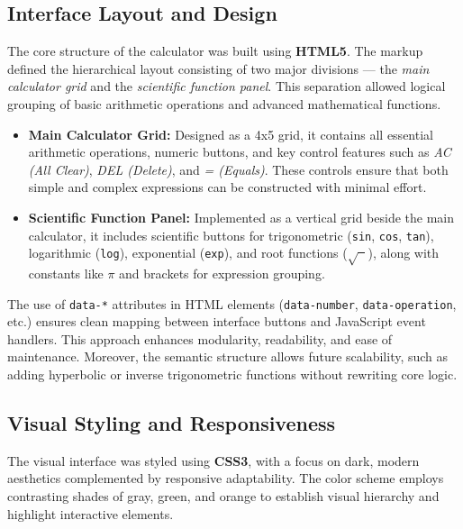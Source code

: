 \documentclass[a4paper,12pt,oneside]{report}
\numberwithin{equation}{chapter}
\numberwithin{figure}{chapter}
\numberwithin{table}{chapter}
\begin{document}
\subsection{Interface Layout and Design}

The core structure of the calculator was built using \textbf{HTML5}. The markup defined the hierarchical layout consisting of two major divisions — the \textit{main calculator grid} and the \textit{scientific function panel}. This separation allowed logical grouping of basic arithmetic operations and advanced mathematical functions.

\begin{itemize}
    \item \textbf{Main Calculator Grid:} Designed as a 4x5 grid, it contains all essential arithmetic operations, numeric buttons, and key control features such as \textit{AC (All Clear)}, \textit{DEL (Delete)}, and \textit{= (Equals)}. These controls ensure that both simple and complex expressions can be constructed with minimal effort.
    \item \textbf{Scientific Function Panel:} Implemented as a vertical grid beside the main calculator, it includes scientific buttons for trigonometric (\texttt{sin}, \texttt{cos}, \texttt{tan}), logarithmic (\texttt{log}), exponential (\texttt{exp}), and root functions (\(\sqrt{\phantom{x}}\)), along with constants like \(\pi\) and brackets for expression grouping.

\end{itemize}

The use of \texttt{data-*} attributes in HTML elements (\texttt{data-number}, \texttt{data-operation}, etc.) ensures clean mapping between interface buttons and JavaScript event handlers. This approach enhances modularity, readability, and ease of maintenance. Moreover, the semantic structure allows future scalability, such as adding hyperbolic or inverse trigonometric functions without rewriting core logic.

\subsection{Visual Styling and Responsiveness}

The visual interface was styled using \textbf{CSS3}, with a focus on dark, modern aesthetics complemented by responsive adaptability. The color scheme employs contrasting shades of gray, green, and orange to establish visual hierarchy and highlight interactive elements.
\end{document}

